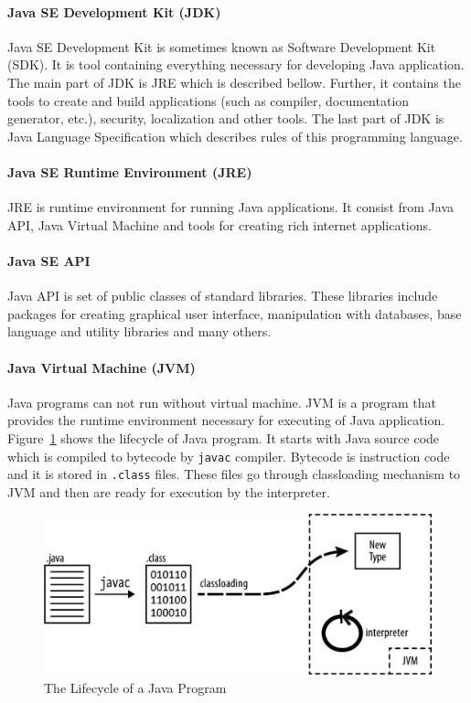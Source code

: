 \paragraph{Java SE Development Kit (JDK)}
Java SE Development Kit is sometimes known as Software Development Kit (SDK). It is tool containing everything necessary for developing Java application. The main part of JDK is JRE which is described bellow. Further, it contains the tools to create and build applications (such as compiler, documentation generator, etc.), security, localization and other tools. The last part of JDK is Java Language Specification which describes rules of this programming language.

\paragraph{Java SE Runtime Environment (JRE)}
JRE is runtime environment for running Java applications. It consist from Java API, Java Virtual Machine and tools for creating rich internet applications.

\paragraph{Java SE API}
Java API is set of public classes of standard libraries. These libraries include packages for creating graphical user interface, manipulation with databases, base language and utility libraries and many others.

\paragraph{Java Virtual Machine (JVM)}
Java programs can not run without virtual machine. JVM is a program that provides the runtime environment necessary for executing of Java application. Figure~\ref{JavaLifecycle} shows the lifecycle of Java program. It starts with Java source code which is compiled to bytecode by \texttt{javac} compiler. Bytecode is instruction code  and it is stored in \texttt{.class} files. These files go through classloading mechanism to JVM and then are ready for execution by the interpreter.
\\
\begin{figure}[h!]
    \centering
    \includegraphics[scale=0.3]{fig/java_program_lifecycle.png}
    \caption{The Lifecycle of a Java Program}
    \label{JavaLifecycle}
\end{figure}

